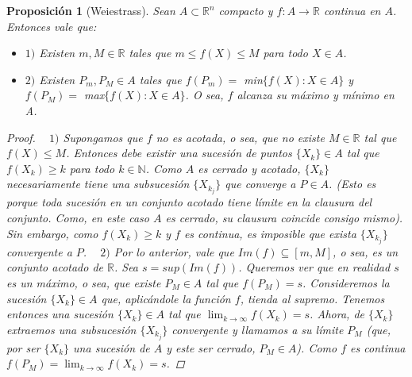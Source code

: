 \documentclass[]{article}
\newtheorem{prop}[teo]{Proposición}
\def\N{\mathbb{N}}
\def\R{\mathbb{R}}
\begin{document}
\begin{prop}[Weiestrass]
	Sean $A \subset \R^n$ compacto y $f:A \to \R$ continua en $A$. Entonces vale que:
	\begin{itemize}
		\item $1)$ Existen $m,M \in \R$ tales que $m \leq f(X) \leq M$ para todo $X \in A$. 
		\item $2)$ Existen $P_m, P_M \in A$ tales que $f(P_m) = $ min$\{f(X):X \in A\}$ y $f(P_M) = $ max$\{f(X):X \in A\}$. O sea, $f$ alcanza su máximo y mínimo en A.
	\end{itemize}
	\begin{proof}
		~\newline
		$1)$ Supongamos que $f$ no es acotada, o sea, que no existe $M \in \R$ tal que $f(X) \leq M$. Entonces debe existir una sucesión de puntos $\{X_k\} \in A$ tal que $f(X_k) \geq k$ para todo $k \in \N$. Como $A$ es cerrado y acotado, $\{X_k\}$ necesariamente tiene una subsucesión $\{X_{k_j}\}$ que converge a $P \in A$. (Esto es porque toda sucesión en un conjunto acotado tiene límite en la clausura del conjunto. Como, en este caso $A$ es cerrado, su clausura coincide consigo mismo).\newline
		Sin embargo, como $f(X_k) \geq k$ y $f$ es continua, es imposible que exista $\{X_{k_j}\}$ convergente a $P$.\newline 
		~\newline
		$2)$ Por lo anterior, vale que $Im(f) \subseteq [m,M]$, o sea, es un conjunto acotado de $\R$. Sea $s = sup(Im(f))$. Queremos ver que en realidad $s$ es un máximo, o sea, que existe $P_M \in A$ tal que $f(P_M) = s$.
		Consideremos la sucesión $\{X_k\} \in A$ que, aplicándole la función $f$, tienda al supremo. Tenemos entonces una sucesión $\{X_k\} \in A$ tal que $\displaystyle \lim_{k \to \infty} f(X_k) = s$. \newline
		Ahora, de $\{X_k\}$ extraemos una subsucesión $\{X_{k_j}\}$ convergente y llamamos a su límite $P_M$ (que, por ser $\{X_k\}$ una sucesión de $A$ y este ser cerrado, $P_M \in A$). Como $f$ es continua $\displaystyle f(P_M) = \lim_{k \to \infty} f(X_k) = s$.
	\end{proof}
\end{prop}
\end{document}
